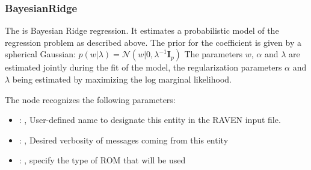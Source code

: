 \subsubsection{BayesianRidge}
  The  is Bayesian Ridge regression.                         It estimates a
  probabilistic model of the regression problem as                         described above. The
  prior for the coefficient is given by a                         spherical Gaussian:
  $p(w|\lambda) = \mathcal{N}(w|0,\lambda^{-1}\mathbf{I}_{p})$                         The
  parameters $w$, $\alpha$ and $\lambda$ are estimated jointly during                         the
  fit of the model, the regularization parameters $\alpha$ and $\lambda$
  being estimated by maximizing the log marginal likelihood.

  The  node recognizes the following parameters:
    \begin{itemize}
      \item {}: ,
        User-defined name to designate this entity in the RAVEN input file.
      \item {}: ,
        Desired verbosity of messages coming from this entity
      \item {}: ,
        specify the type of ROM that will be used
  \end{itemize}

